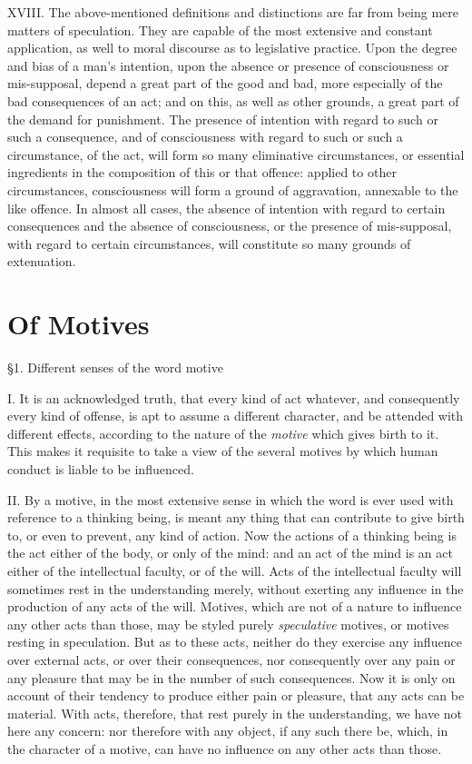 \documentclass[12pt]{report}
\begin{document}
XVIII. The above-mentioned definitions and distinctions are far from
being mere matters of speculation. They are capable of the most
extensive and constant application, as well to moral discourse as to
legislative practice. Upon the degree and bias of a man's intention,
upon the absence or presence of consciousness or mis-supposal, depend a
great part of the good and bad, more especially of the bad consequences
of an act; and on this, as well as other grounds, a great part of the
demand for punishment. The presence of intention with regard to such or
such a consequence, and of consciousness with regard to such or such a
circumstance, of the act, will form so many eliminative circumstances,
or essential ingredients in the composition of this or that offence:
applied to other circumstances, consciousness will form a ground of
aggravation, annexable to the like offence. In almost all cases, the
absence of intention with regard to certain consequences and the absence
of consciousness, or the presence of mis-supposal, with regard to
certain circumstances, will constitute so many grounds of extenuation.

\chapter{Of Motives}

§1. Different senses of the word motive

I. It is an acknowledged truth, that every kind of act whatever, and
consequently every kind of offense, is apt to assume a different
character, and be attended with different effects, according to the
nature of the \emph{motive} which gives birth to it. This makes it
requisite to take a view of the several motives by which human conduct
is liable to be influenced.

II. By a motive, in the most extensive sense in which the word is ever
used with reference to a thinking being, is meant any thing that can
contribute to give birth to, or even to prevent, any kind of action. Now
the actions of a thinking being is the act either of the body, or only
of the mind: and an act of the mind is an act either of the intellectual
faculty, or of the will. Acts of the intellectual faculty will sometimes
rest in the understanding merely, without exerting any influence in the
production of any acts of the will. Motives, which are not of a nature
to influence any other acts than those, may be styled purely
\emph{speculative} motives, or motives resting in speculation. But as to
these acts, neither do they exercise any influence over external acts,
or over their consequences, nor consequently over any pain or any
pleasure that may be in the number of such consequences. Now it is only
on account of their tendency to produce either pain or pleasure, that
any acts can be material. With acts, therefore, that rest purely in the
understanding, we have not here any concern: nor therefore with any
object, if any such there be, which, in the character of a motive, can
have no influence on any other acts than those.
\end{document}
